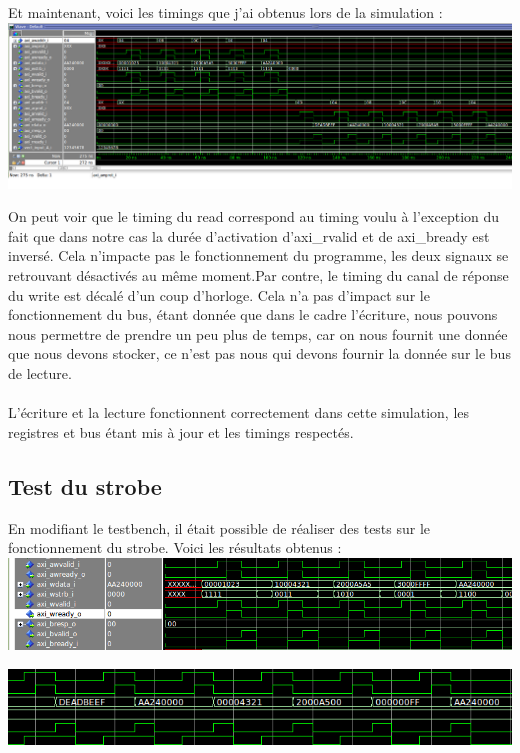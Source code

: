 Et maintenant, voici les timings que j'ai obtenus lors de la simulation : \\

\includegraphics[scale=0.3]{./images/vsim_base_timing.png}

On peut voir que le timing du read correspond au timing voulu à l'exception du fait que dans notre cas la durée d'activation d'axi\_rvalid et de axi\_bready est inversé. Cela n'impacte pas le fonctionnement du programme, les deux signaux se retrouvant désactivés au même moment.Par contre, le timing du canal de réponse du write est décalé d'un coup d'horloge. Cela n'a pas d'impact sur le fonctionnement du bus, étant donnée que dans le cadre l'écriture, nous pouvons nous permettre de prendre un peu plus de temps, car on nous fournit une donnée que nous devons stocker, ce n'est pas nous qui devons fournir la donnée sur le bus de lecture. \\\\
L'écriture et la lecture fonctionnent correctement dans cette simulation, les registres et bus étant mis à jour et les timings respectés.
\subsection{Test du strobe}
En modifiant le testbench, il était possible de réaliser des tests sur le fonctionnement du strobe. Voici les résultats obtenus : \\

\includegraphics[scale=0.5]{./images/write_strb.png}

\includegraphics[scale=0.6]{./images/read_strobe.png}

